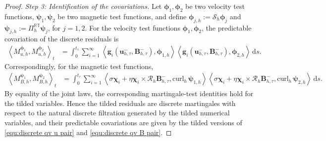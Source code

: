 \documentclass[11pt, reqno]{amsart}
\theoremstyle{definition}
\numberwithin{equation}{section}
\newcommand{\bff}{\boldsymbol}
\newcommand{\bb}{\mathbb}
\newcommand{\ds}{\,\mathrm{d}s}
\newcommand{\inpro}[2]{\left\langle#1,#2\right\rangle}
\newcommand{\curlh}{\mathrm{curl}_h\,}
\begin{document}
\begin{proof}
	
	\emph{Step 3: Identification of the covariations.}
	Let $\bff\phi_1,\bff\phi_2$ be two velocity test functions, $\bff\psi_1,\bff\psi_2$ be two magnetic test functions, and define $\bff\phi_{j,h}:=\mathcal S_h\bff\phi_j$ and $\bff\psi_{j,h}:=\Pi_h^{\bb{RT}}\bff\psi_j$, for $j=1,2$.
	For the velocity test functions $\bff\phi_1,\bff\phi_2$, the predictable
	covariation of the discrete residuals is
	\begin{align}
		\label{equ:discrete qv u pair}
		\inpro{M_{u,h}^{\bff\phi_1}}{M_{u,h}^{\bff\phi_2}}_t
		&=
		\int_0^{t_\tau}
		\sum_{i=1}^{\infty}
		\inpro{
			\bff g_i(\bff u_{h,\tau}^{-},\bff B_{h,\tau}^{-})}
		{\bff\phi_{1,h}}
		\inpro{
			\bff g_i(\bff u_{h,\tau}^{-},\bff B_{h,\tau}^{-})}
		{\bff\phi_{2,h}}
		\ds .
	\end{align}
	Correspondingly, for the magnetic test functions,
	\begin{align}
		\label{equ:discrete qv B pair}
		\inpro{M_{B,h}^{\bff\psi_1}}{M_{B,h}^{\bff\psi_2}}_t
		&=
		\int_0^{t_\tau}
		\sum_{i=1}^{\infty}
		\inpro{
			\sigma\bff\chi_i
			+
			\eta\bff\chi_i\times
			\mathcal R_h\bff B_{h,\tau}^{-}}
		{\curlh\bff\psi_{1,h}}
		\inpro{
			\sigma\bff\chi_i
			+
			\eta\bff\chi_i\times
			\mathcal R_h\bff B_{h,\tau}^{-}}
		{\curlh\bff\psi_{2,h}}
		\ds .
	\end{align}
	By equality of the joint laws, the corresponding martingale-test identities
	hold for the tilded variables. Hence the tilded residuals are discrete
	martingales with respect to the natural discrete filtration generated by
	the tilded numerical variables, and their predictable covariations are
	given by the tilded versions of \eqref{equ:discrete qv u pair} and
	\eqref{equ:discrete qv B pair}.
	

\end{proof}
\end{document}
